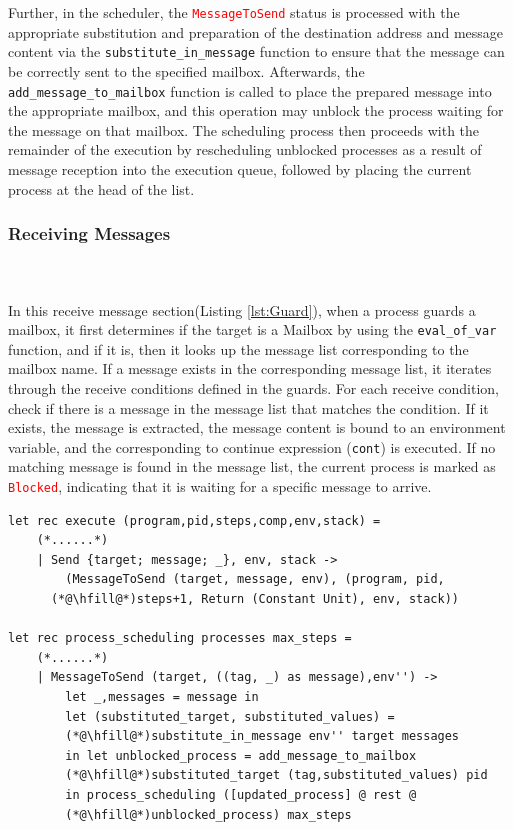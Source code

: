 \documentclass{l4proj}
\begin{document}
Further, in the scheduler, the \textcolor{red}{\texttt{MessageToSend}} status is processed with the appropriate substitution and preparation of the destination address and message content via the \texttt{substitute\_in\_message} function to ensure that the message can be correctly sent to the specified mailbox. Afterwards, the \texttt{add\_message\_to\_mailbox} function is called to place the prepared message into the appropriate mailbox, and this operation may unblock the process waiting for the message on that mailbox. The scheduling process then proceeds with the remainder of the execution by rescheduling unblocked processes as a result of message reception into the execution queue, followed by placing the current process at the head of the list.
\vspace{1\baselineskip} 
\subsubsection{Receiving Messages} \hfill\\\\
In this receive message section(Listing \ref{lst:Guard}), when a process guards a mailbox, it first determines if the target is a Mailbox by using the \texttt{eval\_of\_var} function, and if it is, then it looks up the message list corresponding to the mailbox name. If a message exists in the corresponding message list, it iterates through the receive conditions defined in the guards. For each receive condition, check if there is a message in the message list that matches the condition. If it exists, the message is extracted, the message content is bound to an environment variable, and the corresponding to continue expression (\texttt{cont}) is executed. If no matching message is found in the message list, the current process is marked as \textcolor{red}{\texttt{Blocked}}, indicating that it is waiting for a specific message to arrive.

\noindent\begin{minipage}{\linewidth}
\lstset{style=Ocamlstyle,}
\begin{lstlisting}[caption={Message sending in Pat}, label={lst:Sending}]
let rec execute (program,pid,steps,comp,env,stack) =
    (*......*)
    | Send {target; message; _}, env, stack ->
        (MessageToSend (target, message, env), (program, pid, 
      (*@\hfill@*)steps+1, Return (Constant Unit), env, stack))

let rec process_scheduling processes max_steps =
    (*......*)
    | MessageToSend (target, ((tag, _) as message),env'') ->
        let _,messages = message in
        let (substituted_target, substituted_values) = 
        (*@\hfill@*)substitute_in_message env'' target messages 
        in let unblocked_process = add_message_to_mailbox 
        (*@\hfill@*)substituted_target (tag,substituted_values) pid 
        in process_scheduling ([updated_process] @ rest @ 
        (*@\hfill@*)unblocked_process) max_steps

\end{lstlisting}
\end{minipage}
 
\end{document}
